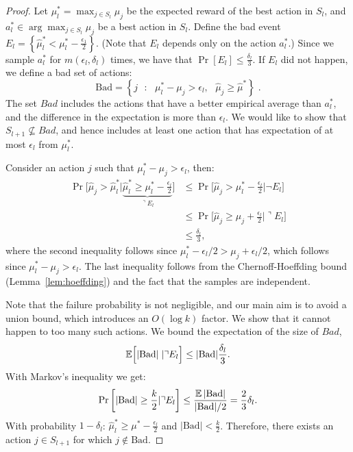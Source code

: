 \begin{proof}
Let $\mu^*_l=\max_{j\in S_l} \mu_j$ be the expected reward of the best action in $S_l$, and $a^*_l\in\arg\max_{j\in S_l} \mu_j$ be a best action in $S_l$.
Define the bad event $E_{l}=\left\{\hat{\mu}^{*}_l<\mu^{*}_l-\frac{\epsilon_{1}}{2}\right\}$. (Note that $E_l$ depends only on the action $a^*_l$.) Since we sample $a^*_l$ for $m(\epsilon_l,\delta_l)$ times, we have that $\Pr\left[E_{l}\right]\le\frac{\delta_{l}}{3}$. If $E_{l}$ did not happen, we define a bad set of actions:
\[
\text{Bad}=\left\{ j\text{ }:\text{ }\mu^{*}_l-\mu_{j}>\epsilon_{l},\text{ }\hat{\mu}_{j}\ge\hat{\mu}^{*}\right\}\;.
\]
The set $Bad$ includes the actions that have a better empirical average than $a_l^*$, and the difference in the expectation is more than $\epsilon_l$. We would like to show that $S_{l+1}\not\subseteq Bad$, and hence includes at least one action that has expectation of at most $\epsilon_l$ from $\mu^*_l$.


Consider an action $j$ such that $\mu^*_l-\mu_j > \epsilon_l$, then:
\begin{align*}
\Pr\Big[\hat{\mu}_{j}>
\hat{\mu}^{*}_l|\underbrace{\hat{\mu}^{*}_l\ge\mu^{*}_l-\frac{\epsilon_{l}}{2}}_{\urcorner
E_{l}}\Big] & \le \Pr\Big[\hat{\mu}_{j}> \mu^{*}_l-\frac{\epsilon_{l}}{2}| \neg E_l\Big]\\
&\leq
\Pr\Big[\hat{\mu}_{j}\ge\mu_{j}+\frac{\epsilon_{l}}{2}|\urcorner E_{l}\Big]\\
&\le  \frac{\delta_{l}}{3},
\end{align*}
where the second inequality follows since $\mu^*_l-\epsilon_l/2 > \mu_j+\epsilon_l/2$, which follows since $\mu^*_l-\mu_j>\epsilon_l$. The last inequality follows from the Chernoff-Hoeffding bound (Lemma~\ref{lem:hoeffding}) and the fact that the samples are independent.



Note that the failure probability is not negligible, and our main aim is to avoid a union bound, which  introduces an $O(\log k)$ factor. We  show that it cannot happen to too many such actions. We  bound the expectation of the size of $Bad$,
\[
\mathbb{E}\Big[|\text{Bad}|\;|\urcorner E_{l}\Big]\le |\text{Bad}|\frac{\delta_{l}}{3}.
\]
With Markov's inequality we get:
\[
\Pr\left[\left|\text{Bad}\right|\ge\frac{k}{2}|\urcorner E_{l}\right]
 \le  \frac{\mathbb{E}\left|\text{Bad}\right|}{|\text{Bad}|/2}
  =  \frac{2}{3}\delta_{l}.
\]
With probability $1-\delta_{l}$: $\hat{\mu}^{*}_l\ge\mu^{*}-\frac{\epsilon_{l}}{2}$ and $\left|\text{Bad}\right|<\frac{k}{2}$. Therefore, there exists an action $j\in S_{l+1}$ for which $j \notin\text{Bad}$.
\end{proof}

